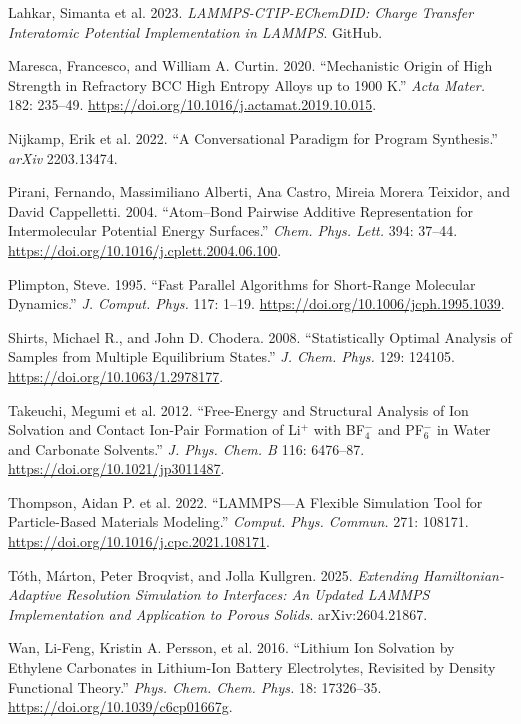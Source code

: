\documentclass[
  11pt,
]{article}
\newlength{\cslhangindent}
\newenvironment{CSLReferences}[2] %
 {\begin{list}{}{%
  \setlength{\itemindent}{0pt}
  \setlength{\leftmargin}{0pt}
  \setlength{\parsep}{0pt}
  \ifodd #1
   \setlength{\leftmargin}{\cslhangindent}
   \setlength{\itemindent}{-1\cslhangindent}
  \fi
  \setlength{\itemsep}{#2\baselineskip}}}
 {\end{list}}
\begin{document}
\begin{CSLReferences}{1}{1}
{Lahkar, Simanta et al.} 2023. \emph{{LAMMPS-CTIP-EChemDID}: Charge
Transfer Interatomic Potential Implementation in {LAMMPS}}. GitHub.

Maresca, Francesco, and William A. Curtin. 2020. {``Mechanistic Origin
of High Strength in Refractory {BCC} High Entropy Alloys up to 1900
{K}.''} \emph{Acta Mater.} 182: 235--49.
\url{https://doi.org/10.1016/j.actamat.2019.10.015}.

{Nijkamp, Erik et al.} 2022. {``A Conversational Paradigm for Program
Synthesis.''} \emph{arXiv} 2203.13474.

Pirani, Fernando, Massimiliano Alberti, Ana Castro, Mireia Morera
Teixidor, and David Cappelletti. 2004. {``Atom--Bond Pairwise Additive
Representation for Intermolecular Potential Energy Surfaces.''}
\emph{Chem. Phys. Lett.} 394: 37--44.
\url{https://doi.org/10.1016/j.cplett.2004.06.100}.

Plimpton, Steve. 1995. {``Fast Parallel Algorithms for Short-Range
Molecular Dynamics.''} \emph{J. Comput. Phys.} 117: 1--19.
\url{https://doi.org/10.1006/jcph.1995.1039}.

Shirts, Michael R., and John D. Chodera. 2008. {``Statistically Optimal
Analysis of Samples from Multiple Equilibrium States.''} \emph{J. Chem.
Phys.} 129: 124105. \url{https://doi.org/10.1063/1.2978177}.

{Takeuchi, Megumi et al.} 2012. {``Free-Energy and Structural Analysis
of Ion Solvation and Contact Ion-Pair Formation of {Li\(^+\)} with
{BF\(_4^-\)} and {PF\(_6^-\)} in Water and Carbonate Solvents.''}
\emph{J. Phys. Chem. B} 116: 6476--87.
\url{https://doi.org/10.1021/jp3011487}.

{Thompson, Aidan P. et al.} 2022. {``{LAMMPS}---{A} Flexible Simulation
Tool for Particle-Based Materials Modeling.''} \emph{Comput. Phys.
Commun.} 271: 108171. \url{https://doi.org/10.1016/j.cpc.2021.108171}.

Tóth, Márton, Peter Broqvist, and Jolla Kullgren. 2025. \emph{Extending
{Hamiltonian}-Adaptive Resolution Simulation to Interfaces: {An} Updated
{LAMMPS} Implementation and Application to Porous Solids}.
arXiv:2604.21867.

{Wan, Li-Feng, Kristin A. Persson, et al.} 2016. {``Lithium Ion
Solvation by Ethylene Carbonates in Lithium-Ion Battery Electrolytes,
Revisited by Density Functional Theory.''} \emph{Phys. Chem. Chem.
Phys.} 18: 17326--35. \url{https://doi.org/10.1039/c6cp01667g}.


\end{CSLReferences}
\end{document}
